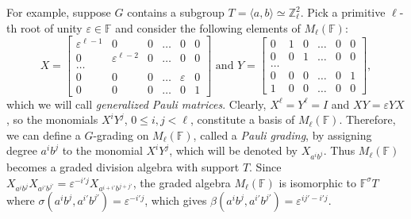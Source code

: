 \documentclass[a4paper,reqno]{amsart}
\theoremstyle{definition}
\numberwithin{theorem}{section}
\numberwithin{equation}{section}
\begin{document}
For example, suppose $G$ contains a subgroup $T=\langle a,b\rangle\simeq{\mathbb{Z}}_\ell^2$. Pick a primitive $\ell$-th root of unity ${\varepsilon}\in{\mathbb{F}}$ and consider the following elements of $M_\ell({\mathbb{F}})$:
\begin{equation}\label{Pauli}
X=\begin{bmatrix}
{\varepsilon}^{\ell-1} & 0                 & 0           & \ldots      & 0     & 0\\
0           & {\varepsilon}^{\ell-2}       & 0           & \ldots      & 0     & 0\\
\ldots      &                   &             &             &       &  \\[3pt]
0           & 0                 & 0           & \ldots      & {\varepsilon} & 0\\
0           & 0                 & 0           & \ldots      & 0     & 1
\end{bmatrix}\mbox{ and }
Y=\begin{bmatrix}
0 & 1 & 0 & \ldots & 0 & 0\\
0 & 0 & 1 & \ldots & 0 & 0\\
\ldots & & & & \\[3pt]
0 & 0 & 0 & \ldots & 0 & 1\\
1 & 0 & 0 & \ldots & 0 & 0
\end{bmatrix},
\end{equation}
which we will call \emph{generalized Pauli matrices}. Clearly, $X^\ell=Y^\ell=I$ and $XY={\varepsilon} YX$, so the monomials $X^iY^j$, $0\le i,j<\ell$, constitute a basis of $M_\ell({\mathbb{F}})$. Therefore, we can define a $G$-grading on $M_\ell({\mathbb{F}})$, called a \emph{Pauli grading}, by assigning degree $a^ib^j$ to the monomial $X^iY^j$, which will be denoted by $X_{a^ib^j}$. Thus $M_\ell({\mathbb{F}})$ becomes a graded division algebra with support $T$. Since $X_{a^ib^j}X_{a^{i'}b^{j'}}={\varepsilon}^{-i'j}X_{a^{i+i'}b^{j+j'}}$, the graded algebra $M_\ell({\mathbb{F}})$ is isomorphic to ${\mathbb{F}}^\sigma T$ where $\sigma(a^ib^j,a^{i'}b^{j'})={\varepsilon}^{-i'j}$, which gives $\beta(a^ib^j,a^{i'}b^{j'})={\varepsilon}^{ij'-i'j}$.
\end{document}
